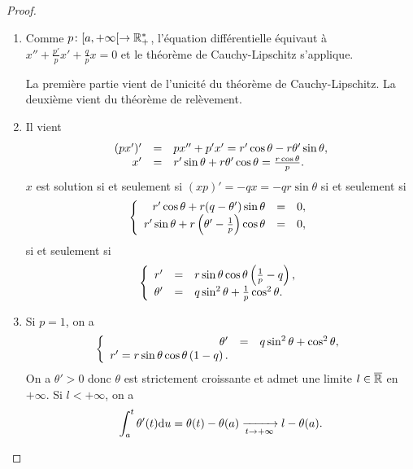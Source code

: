\documentclass[12pt]{article}
\begin{document}
\begin{proof}
	\phantom{}
	\begin{enumerate}
		\item Comme $p\colon[a,+\infty[\to\mathbb{R}_{+}^{*}$, l'équation différentielle équivaut à $x''+\frac{p'}{p}x'+\frac{q}{p}x=0$ et le théorème de Cauchy-Lipschitz s'applique.
		
		La première partie vient de l'unicité du théorème de Cauchy-Lipschitz. La deuxième vient du théorème de relèvement.

		\item Il vient
		\begin{equation*}
			\begin{array}[]{rcl}
				(px')'&=&px''+p'x'=r'\cos\theta-r\theta'\sin\theta,\\
				x' &=& r'\sin\theta+r\theta'\cos\theta=\frac{r\cos\theta}{p}.
			\end{array}
		\end{equation*}
		$x$ est solution si et seulement si $(xp)'=-qx=-qr\sin\theta$ si et seulement si 
		\begin{equation*}
			\left\lbrace
				\begin{array}[]{rcl}
					r'\cos\theta+r(q-\theta')\sin\theta &=&0,\\
					r'\sin\theta+r\left(\theta'-\frac{1}{p}\right)\cos\theta&=&0,
				\end{array}
			\right.
		\end{equation*}
		si et seulement si 
		\begin{equation*}
			\left\lbrace
			\begin{array}[]{rcl}
				r'&=&r\sin\theta\cos\theta\left(\frac{1}{p}-q\right),\\
				\theta'&=&q\sin^{2}\theta+\frac{1}{p}\cos^{2}\theta.
			\end{array}
			\right.
		\end{equation*}

		\item Si $p=1$, on a 
		\begin{equation*}
			\left\lbrace
				\begin{array}[]{rcl}
					\theta'&=&q\sin^{2}\theta+\cos^{2}\theta,\\
					r'=r\sin\theta\cos\theta\left(1-q\right).
				\end{array}
			\right.
		\end{equation*}
		On a $\theta'>0$ donc $\theta$ est strictement croissante et admet une limite $l\in\overline{\mathbb{R}}$ en $+\infty$. Si $l<+\infty$, on a 
		\begin{equation*}
			\int_{a}^{t}\theta'(t)\mathrm{d} u=\theta(t)-\theta(a)\xrightarrow[t\to+\infty]{}l-\theta(a).
		\end{equation*}


\end{enumerate}
\end{proof}
\end{document}
